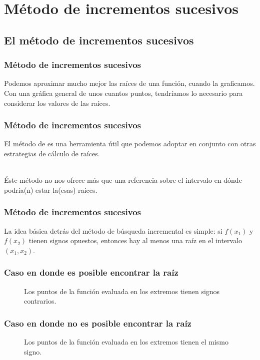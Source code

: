 \documentclass[12pt]{beamer}
\begin{document}
\section{Método de incrementos sucesivos}
\subsection{El método de incrementos sucesivos}

\begin{frame}
\frametitle{Método de incrementos sucesivos}
Podemos aproximar mucho mejor las raíces de una función, cuando la graficamos.
\\
\bigskip
\pause
Con una gráfica general de unos cuantos puntos, tendríamos lo necesario para considerar los valores de las raíces.
\end{frame}
\begin{frame}
\frametitle{Método de incrementos sucesivos}
El método de  es una herramienta útil que podemos adoptar en conjunto con otras estrategias de cálculo de raíces.
\\
\bigskip
\

Éste método no nos ofrece más que una referencia sobre el intervalo en dónde podría(n) estar la(esas) raíces.
\end{frame}
\begin{frame}
\frametitle{Método de incrementos sucesivos}
La idea básica detrás del método de búsqueda incremental es simple: si $f(x_{1})$ y $f(x_{2})$ tienen signos opuestos, entonces hay al menos una raíz en el intervalo $(x_{1}, x_{2})$.
\end{frame}
\begin{frame}[fragile]
\frametitle{Caso en donde es posible encontrar la raíz}
\begin{figure}
	\centering
	
	\caption{Los puntos de la función evaluada en los extremos tienen signos contrarios.}
\end{figure}
\end{frame}
\begin{frame}[fragile]
\frametitle{Caso en donde no es posible encontrar la raíz}
\begin{figure}
	\centering
	
	\caption{Los puntos de la función evaluada en los extremos tienen el mismo signo.}
\end{figure}
\end{frame}
\end{document}
